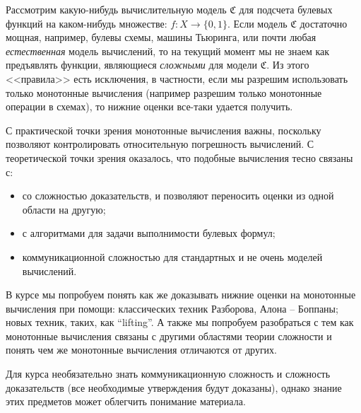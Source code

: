 Рассмотрим какую-нибудь вычислительную модель $\mathfrak{C}$ для подсчета булевых функций на каком-нибудь
множестве: $f\colon X \to \{0, 1\}$. Если модель $\mathfrak{C}$ достаточно мощная, например, булевы
схемы, машины Тьюринга, или почти любая \emph{естественная} модель вычислений, то на текущий момент мы не
знаем как предъявлять функции, являющиеся \emph{сложными} для модели $\mathfrak{C}$. Из этого <<правила>>
есть исключения, в частности, если мы разрешим использовать только монотонные вычисления (например
разрешим только монотонные операции в схемах), то нижние оценки все-таки удается получить.

С практической точки зрения монотонные вычисления важны, поскольку позволяют контролировать относительную
погрешность вычислений. С теоретической точки зрения оказалось, что подобные вычисления тесно связаны с:
\begin{itemize}
    \item со сложностью доказательств, и позволяют переносить оценки из одной области на другую;
    \item с алгоритмами для задачи выполнимости булевых формул;
    \item коммуникационной сложностью для стандартных и не очень моделей вычислений.
\end{itemize}

В курсе мы попробуем понять как же доказывать нижние оценки на монотонные вычисления при помощи:
классических техник Разборова, Алона -- Боппаны; новых техник, таких, как ``lifting''. А также мы
попробуем разобраться с тем как монотонные вычисления связаны с другими областями теории сложности и 
понять чем же монотонные вычисления отличаются от других.

Для курса необязательно знать коммуникационную сложность и сложность доказательств (все необходимые
утверждения будут доказаны), однако знание этих предметов может облегчить понимание материала.